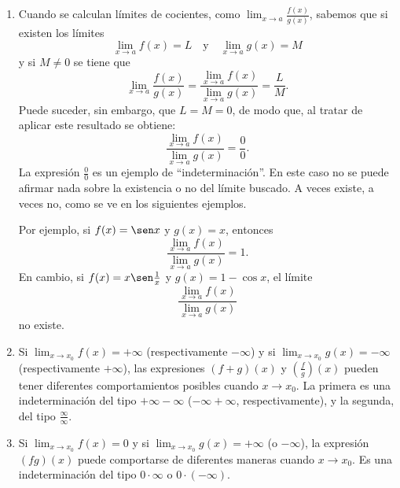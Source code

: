 \begin{enumerate}[leftmargin=*]
\item Cuando se calculan límites de cocientes, como $\displaystyle{\lim_{x\rightarrow a}\frac{f(x)}{g(x)}}$,
    sabemos que si existen los límites
\begin{equation*}
	\lim_{x\rightarrow a}f(x)=L\quad \text{y}\quad \lim_{x\rightarrow a}g(x)=M
\end{equation*}
y si $M\neq 0$ se tiene que
\begin{equation*}
	\lim_{x\rightarrow a}\frac{f(x)}{g(x)}=\frac{\displaystyle{\lim_{x\rightarrow a}f(x)}}{\displaystyle{\lim_{x\rightarrow a}g(x)}}=\frac{L}{M}.
\end{equation*}
Puede suceder, sin embargo, que $L=M=0$, de modo que, al tratar de aplicar este resultado se
obtiene:
\begin{equation*}
	 \displaystyle{\frac{\displaystyle{\lim_{x\rightarrow a}f(x)}}{\displaystyle{\lim_{x\rightarrow a}g(x)}}=\frac{0}{0}.}
\end{equation*}
La expresión $\frac{0}{0}$  es un ejemplo de ``indeterminación''. En este caso no se puede
afirmar nada sobre la existencia o no del límite buscado. A veces existe, a veces no, como se
ve en los siguientes ejemplos.

Por ejemplo, si $f(x)=\sen x$ y $g(x)= x$, entonces
\begin{equation*}
	 \frac{\displaystyle{\lim_{x\rightarrow a}f(x)}}{\displaystyle{\lim_{x\rightarrow a}g(x)}}=1.
\end{equation*}
En cambio, si $f(x)=x\sen \frac{1}{x}$ y $g(x)= 1-\cos x$, el límite
\begin{equation*}
	 \frac{\displaystyle{\lim_{x\rightarrow a}f(x)}}{\displaystyle{\lim_{x\rightarrow a}g(x)}}
\end{equation*}
no existe.

\item Si $\displaystyle{\lim_{x\rightarrow x_{0}}f(x)}=+\infty$ (respectivamente $-\infty$) y si
    $\displaystyle{\lim_{x\rightarrow x_{0}}g(x)}=-\infty$ (respectivamente $+\infty$), las expresiones
    $(f+g)(x)$ y $\left(\frac{f}{g}\right)(x)$ pueden tener diferentes comportamientos posibles
    cuando $x\rightarrow x_{0}$. La primera es una indeterminación del tipo $+\infty -\infty$
    ($-\infty +\infty$, respectivamente), y la segunda, del tipo $\frac{\infty}{\infty}$.

\item Si $\displaystyle\lim_{x\rightarrow x_{0}}f(x)=0$ y si $\displaystyle\lim_{x\rightarrow x_{0}}g(x)=+\infty$ (o
    $-\infty$), la expresión $(fg)(x)$ puede comportarse de diferentes maneras cuando
    $x\rightarrow x_{0}$. Es una indeterminación del tipo $0\cdot \infty$ o $0\cdot (-\infty)$.

\end{enumerate}


